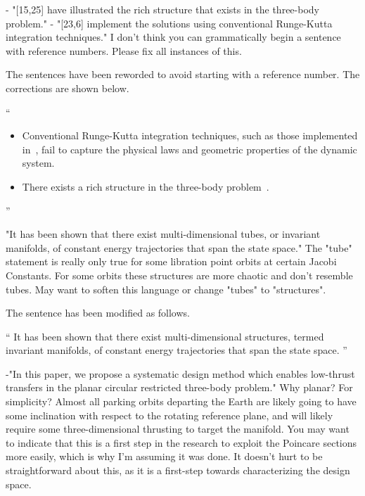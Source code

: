 \documentclass[11pt]{article}
\newenvironment{correction}{\begin{list}{}{\setlength{\leftmargin}{1cm}\setlength{\rightmargin}{1cm}}\vspace{\parsep}\item[]``}{''\end{list}}
\begin{document}
\begin{enumerate}
\item 
\begin{itshape}
- "[15,25] have illustrated the rich structure that exists in the three-body problem." 
- "[23,6] implement the solutions using conventional Runge-Kutta integration techniques."
I don't think you can grammatically begin a sentence with reference numbers.  Please fix all instances of this.
\end{itshape}

The sentences have been reworded to avoid starting with a reference number. 
The corrections are shown below.

\begin{correction}
    \begin{itemize}
        \item Conventional Runge-Kutta integration techniques, such as those implemented in~\cite{mingotti2011,grebow2011}, fail to capture the physical laws and geometric properties of the dynamic system.
        \item There exists a rich structure in the three-body problem~\cite{koon2011,ross2006}.
    \end{itemize}
\end{correction}

\item 
    \begin{itshape}
"It has been shown that there exist multi-dimensional tubes, or invariant manifolds, of constant energy trajectories that span the state space."  The "tube" statement is really only true for some libration point orbits at certain Jacobi Constants.  For some orbits these structures are more chaotic and don't resemble tubes.  May want to soften this language or change "tubes" to "structures".
\end{itshape}

The sentence has been modified as follows.

\begin{correction}
It has been shown that there exist multi-dimensional structures, termed invariant manifolds, of constant energy trajectories that span the state space. 
\end{correction}

\item 
    \begin{itshape}
-"In this paper, we propose a systematic design method which enables low-thrust transfers in the planar circular restricted three-body problem." Why planar?  For simplicity?  Almost all parking orbits departing the Earth are likely going to have some inclination with respect to the rotating reference plane, and will likely require some three-dimensional thrusting to target the manifold.  You may want to indicate that this is a first step in the research to exploit the Poincare sections more easily, which is why I'm assuming it was done.  It doesn't hurt to be straightforward about this, as it is a first-step towards characterizing the design space.
\end{itshape}


\end{enumerate}
\end{document}
